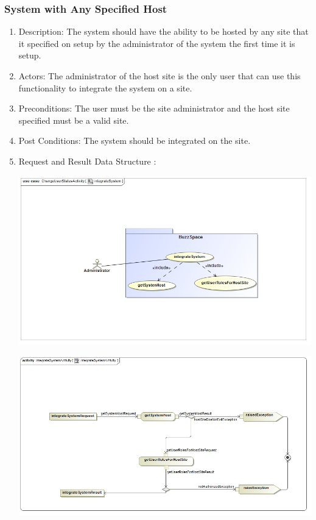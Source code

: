 \documentclass[hidelinks, 12pt, oneside]{article}
\begin{document}
\subsubsection{System with Any Specified Host}
\begin{enumerate}
\item Description: The system should have the ability to be hosted by any site that it specified on setup by the administrator of the system the first time it is setup.
\item Actors: The administrator of the host site is the only user that can use this functionality to integrate the system on a site.
\item Preconditions: The user must be the site administrator and the host site specified must be a valid site.
\item Post Conditions: The system should be integrated on the site.
\item Request and Result Data Structure : 
\begin{center}
\centerline{\includegraphics[scale=0.5]{integrateSystem.jpg}}
\centerline{\includegraphics[scale=0.5]{integrateSystemActivity.jpg}}
\end{center}
\end{enumerate}
\end{document}
